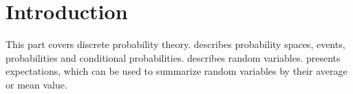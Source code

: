 \chapter{Introduction}
\label{ch:probability::introduction}

\begin{cluster}
\label{grp:grm:probability::introduction::part}

\begin{gram}
\label{grm:probability::introduction::part}
This part covers discrete probability theory.
 describes probability spaces, events, probabilities
and conditional probabilities.
 describes random variables.
 presents expectations, which can be used
to summarize random variables by their average or mean value.

\end{gram}
\end{cluster}

